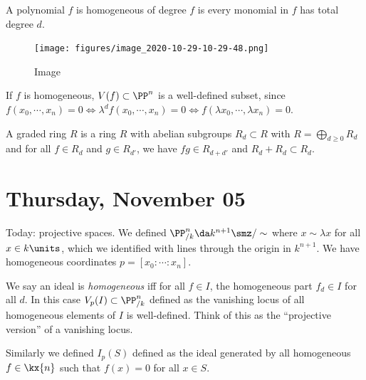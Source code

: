 \begin{definition}

A polynomial \(f\) is homogeneous of degree \(f\) is every monomial in
\(f\) has total degree \(d\).

\end{definition}

\begin{example}[?]

\begin{figure}
\centering
\texttt{[image: figures/image\_2020-10-29-10-29-48.png]}
\caption{Image}
\end{figure}

\end{example}

If \(f\) is homogeneous, \(V(f) \subset \PP^n\) is a well-defined
subset, since
\(f(x_0, \cdots, x_n) = 0 \iff \lambda^d f(x_0, \cdots, x_n) = 0 \iff f(\lambda x_0, \cdots, \lambda x_n) = 0\).

\begin{definition}[?]

A graded ring \(R\) is a ring \(R\) with abelian subgroups
\(R_d \subset R\) with \(R = \bigoplus_{d\geq 0} R_d\) and for all
\(f\in R_d\) and \(g\in R_{d'}\), we have \(fg \in R_{d+d'}\) and
\(R_d + R_{d} \subset R_d\).

\end{definition}

\hypertarget{thursday-november-05}{%
\section{Thursday, November 05}\label{thursday-november-05}}

Today: projective spaces. We defined
\(\PP^n_{/k} \da k^{n+1}\smz /\sim\) where \(x\sim \lambda x\) for all
\(x\in k\units\), which we identified with lines through the origin in
\(k^{n+1}\). We have homogeneous coordinates
\(p = [x_0: \cdots : x_n]\).

We say an ideal is \emph{homogeneous} iff for all \(f\in I\), the
homogeneous part \(f_d\in I\) for all \(d\). In this case
\(V_p(I) \subset \PP^{n}_{/k}\) defined as the vanishing locus of all
homogeneous elements of \(I\) is well-defined. Think of this as the
``projective version'' of a vanishing locus.

Similarly we defined \(I_p(S)\) defined as the ideal generated by all
homogeneous \(f\in \kx{n}\) such that \(f(x) = 0\) for all \(x\in S\).

